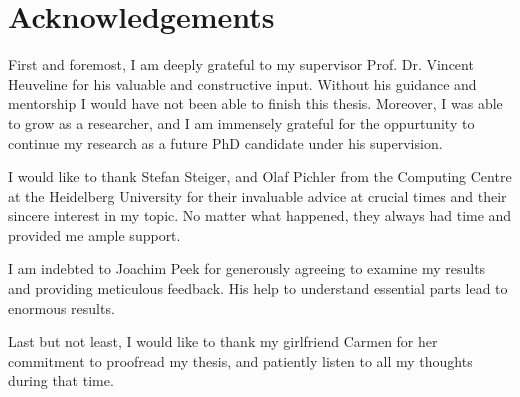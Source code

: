 \chapter*{Acknowledgements}
\thispagestyle{empty}

First and foremost, I am deeply grateful to my supervisor Prof. Dr. Vincent Heuveline for his valuable and constructive input.
Without his guidance and mentorship I would have not been able to finish this thesis.
Moreover, I was able to grow as a researcher, and I am immensely grateful for the oppurtunity to continue my research as a future PhD candidate under his supervision.

I would like to thank Stefan Steiger, and Olaf Pichler from the Computing Centre at the Heidelberg University for their invaluable advice at crucial times and their sincere interest in my topic.
No matter what happened, they always had time and provided me ample support.

I am indebted to Joachim Peek for generously agreeing to examine my results and providing meticulous feedback.
His help to understand essential parts lead to enormous results.

Last but not least, I would like to thank my girlfriend Carmen for her commitment to proofread my thesis, and patiently listen to all my thoughts during that time.

